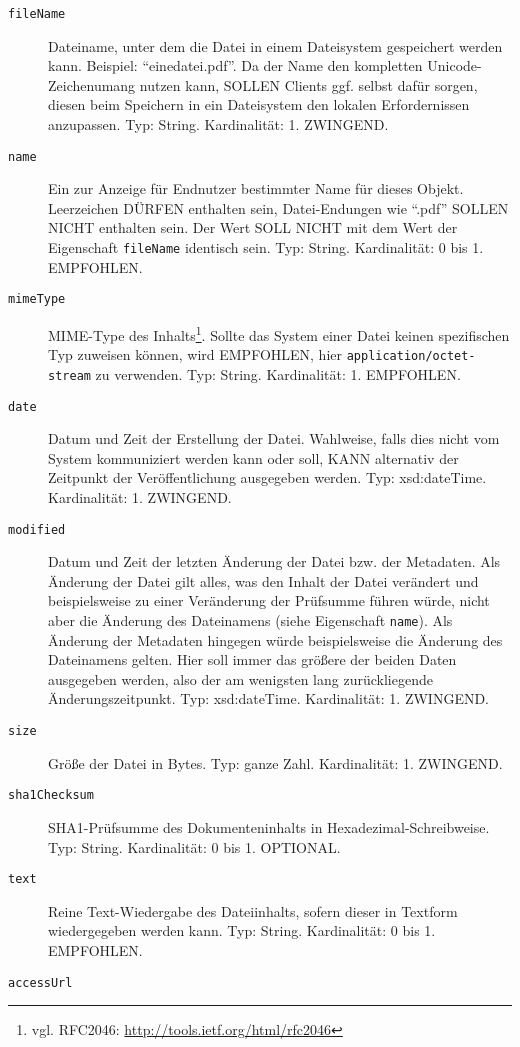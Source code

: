 \documentclass[,a4paper]{article}
\begin{document}
\begin{description}
\item[\texttt{fileName}]
Dateiname, unter dem die Datei in einem Dateisystem gespeichert werden
kann. Beispiel: ``einedatei.pdf''. Da der Name den kompletten
Unicode-Zeichenumang nutzen kann, SOLLEN Clients ggf. selbst dafür
sorgen, diesen beim Speichern in ein Dateisystem den lokalen
Erfordernissen anzupassen. Typ: String. Kardinalität: 1. ZWINGEND.
\item[\texttt{name}]
Ein zur Anzeige für Endnutzer bestimmter Name für dieses Objekt.
Leerzeichen DÜRFEN enthalten sein, Datei-Endungen wie ``.pdf'' SOLLEN
NICHT enthalten sein. Der Wert SOLL NICHT mit dem Wert der Eigenschaft
\texttt{fileName} identisch sein. Typ: String. Kardinalität: 0 bis 1.
EMPFOHLEN.
\item[\texttt{mimeType}]
MIME-Type des Inhalts\footnote{vgl. RFC2046:
  \url{http://tools.ietf.org/html/rfc2046}}. Sollte das System einer
Datei keinen spezifischen Typ zuweisen können, wird EMPFOHLEN, hier
\texttt{application/octet-stream} zu verwenden. Typ: String.
Kardinalität: 1. EMPFOHLEN.
\item[\texttt{date}]
Datum und Zeit der Erstellung der Datei. Wahlweise, falls dies nicht vom
System kommuniziert werden kann oder soll, KANN alternativ der Zeitpunkt
der Veröffentlichung ausgegeben werden. Typ: xsd:dateTime. Kardinalität:
1. ZWINGEND.
\item[\texttt{modified}]
Datum und Zeit der letzten Änderung der Datei bzw. der Metadaten. Als
Änderung der Datei gilt alles, was den Inhalt der Datei verändert und
beispielsweise zu einer Veränderung der Prüfsumme führen würde, nicht
aber die Änderung des Dateinamens (siehe Eigenschaft \texttt{name}). Als
Änderung der Metadaten hingegen würde beispielsweise die Änderung des
Dateinamens gelten. Hier soll immer das größere der beiden Daten
ausgegeben werden, also der am wenigsten lang zurückliegende
Änderungszeitpunkt. Typ: xsd:dateTime. Kardinalität: 1. ZWINGEND.
\item[\texttt{size}]
Größe der Datei in Bytes. Typ: ganze Zahl. Kardinalität: 1. ZWINGEND.
\item[\texttt{sha1Checksum}]
SHA1-Prüfsumme des Dokumenteninhalts in Hexadezimal-Schreibweise. Typ:
String. Kardinalität: 0 bis 1. OPTIONAL.
\item[\texttt{text}]
Reine Text-Wiedergabe des Dateiinhalts, sofern dieser in Textform
wiedergegeben werden kann. Typ: String. Kardinalität: 0 bis 1.
EMPFOHLEN.
\item[\texttt{accessUrl}]

\end{description}
\end{document}
